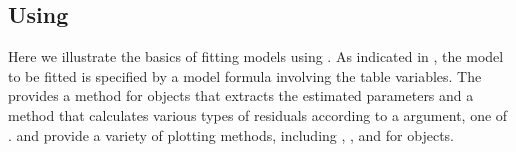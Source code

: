\documentclass[11pt]{book}\usepackage[]{graphicx}\usepackage[]{color}
\begin{document}
\subsection[Using loglm()]{Using }\label{loglin-loglin}
Here we illustrate the basics of fitting \loglin models using
.  As indicated in ,
the model to be fitted is specified by a model formula
involving the table variables.
The  provides a  method for  objects
that extracts the estimated parameters and a  method that
calculates various types of residuals according to a 
argument, one of .
 and  provide a variety of plotting methods,
including , ,  and 
for  objects.
\end{document}
